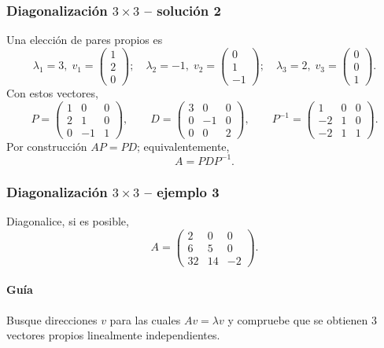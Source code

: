 \subsubsection*{Diagonalización $3\times 3$ -- solución 2}
\scriptsize
Una elección de pares propios es
\[
\lambda_1=3,\;v_1=\begin{pmatrix}1\\2\\0\end{pmatrix};\quad \lambda_2=-1,\;v_2=\begin{pmatrix}0\\1\\-1\end{pmatrix};\quad \lambda_3=2,\;v_3=\begin{pmatrix}0\\0\\1\end{pmatrix}.
\]
Con estos vectores,
\[
P=\begin{pmatrix}1 & 0 & 0\\2 & 1 & 0\\0 & -1 & 1\end{pmatrix},\qquad D=\begin{pmatrix}3 & 0 & 0\\0 & -1 & 0\\0 & 0 & 2\end{pmatrix},\qquad P^{-1}=\begin{pmatrix}1 & 0 & 0\\-2 & 1 & 0\\-2 & 1 & 1\end{pmatrix}.
\]
Por construcción $AP=PD$; equivalentemente,
\[
\boxed{A=PDP^{-1}}.
\]


\subsubsection*{Diagonalización $3\times 3$ -- ejemplo 3}

Diagonalice, si es posible,
\[
A=\begin{pmatrix}2 & 0 & 0\\6 & 5 & 0\\32 & 14 & -2\end{pmatrix}.
\]

\paragraph{Guía}
Busque direcciones $v$ para las cuales $Av=\lambda v$ y compruebe que se obtienen $3$ vectores propios linealmente independientes.



